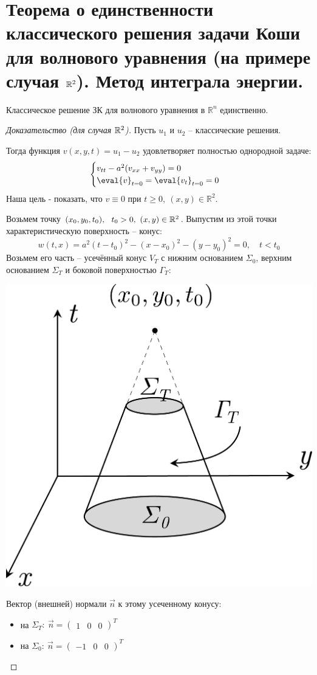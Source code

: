 \documentclass[../main.tex]{subfiles}
\begin{document}
\section[Теорема единственности для волнового уравнения]{Теорема о единственности классического решения задачи Коши для волнового уравнения (на примере случая $\mathbb{R}^2$). Метод интеграла энергии.}


\begin{theorem} Классическое решение ЗК для волнового уравнения в $\mathbb{R}^n$ единственно.
\end{theorem}
\begin{proof}[Доказательство (для случая $\mathbb{R}^2$)]
Пусть $u_{1}$ и $u_{2}$ -- классические решения.

Тогда функция $v(x,y,t) = u_1 - u_2$ удовлетворяет полностью однородной задаче: 
$$
\begin{cases}
  v_{tt} - a^2(v_{xx} + v_{yy}) = 0\\
  \eval{v}_{t=0} = \eval{v_t}_{t=0} = 0
\end{cases}
$$
Наша цель - показать, что $v\equiv 0 $ при $ t\geq 0,\ (x,y) \in \mathbb{R}^2$.

Возьмем точку $ (x_0, y_0, t_0),\ \ t_0 > 0,\ (x,y) \in \mathbb{R}^2$. \; Выпустим из этой точки характеристическую поверхность -- конус:
$$ 
w(t,x) = a^2(t - t_0)^2 - (x - x_0)^2 - (y - y_0)^2 = 0,\quad t < t_0
$$
Возьмем его часть -- усечённый конус $ V_T $ с нижним основанием $ \Sigma_0 $, верхним основанием $ \Sigma_T $  и боковой поверхностью $ \Gamma_T:$
\begin{center}
\includegraphics[width=0.28\linewidth]{./pic 10.pdf}
\end{center}
Вектор (внешней) нормали $ \vec{n} $ к этому усеченному конусу:
\begin{itemize}
	\item на $\Sigma_T:\ \vec{n} = \begin{pmatrix}1 & 0 & 0\end{pmatrix}^T $
	
	\item на $\Sigma_0:\ \vec{n} = \begin{pmatrix}-1 & 0 & 0\end{pmatrix}^T $
	

\end{itemize}
\end{proof}
\end{document}
